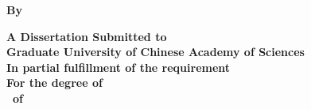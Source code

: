 \newpage
\thispagestyle{empty}

\vspace{1cm}

\begin{center}
    \songti\sanhao\bfseries \uline{\ioatitlee}          
\end{center}
\vspace{2cm}
\begin{center}
    \textbf{\sanhao By\\\xiaosan \ioaauthornamee}
\end{center}
\vspace{2cm}
\begin{center}
    \sanhao\bfseries A Dissertation Submitted to\\
    Graduate University of Chinese Academy of Sciences\\
    In partial fulfillment of the requirement\\
    For the degree of\\
    \ioadegreee~of~\ioamajore

    \vspace{2cm}
    \ioadepartmente

  \makebox{\songti\sihao\textbf{\ioadatee}}
\end{center}


